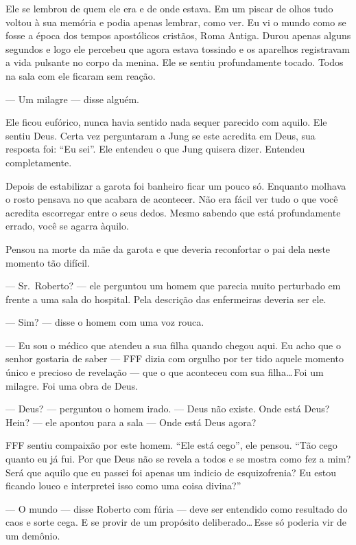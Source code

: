 Ele se lembrou de quem ele era e de onde estava. Em um piscar de olhos\mudanca{,} tudo voltou à sua memória e  podia apenas lembrar, como ver. Eu vi o mundo como se fosse a época dos tempos apostólicos cristãos, Roma Antiga. Durou apenas alguns segundos e logo ele percebeu que agora estava tossindo e os aparelhos registravam a vida pulsante no corpo da menina. Ele se sentiu profundamente tocado. Todos na sala com ele ficaram sem reação.

--- Um milagre --- disse alguém.

Ele ficou eufórico, nunca havia sentido nada sequer parecido com aquilo. Ele sentiu Deus. Certa vez perguntaram a Jung se este acredita em Deus, sua resposta foi: ``Eu sei''. Ele entendeu o que Jung quisera dizer. Entendeu completamente.

Depois de estabilizar a garota\mudanca{,} foi  banheiro ficar um pouco só. Enquanto molhava o rosto pensava no que acabara de acontecer. Não era fácil ver tudo o que você acredita escorregar entre o seus dedos. Mesmo sabendo que está profundamente errado, você se agarra àquilo.

Pensou na morte da mãe da garota e que deveria reconfortar o pai dela neste momento tão difícil.

--- Sr.~Roberto? --- ele perguntou  um homem que parecia muito perturbado em frente a uma sala do hospital. Pela descrição das enfermeiras deveria ser ele.

--- Sim? --- disse o homem com uma voz rouca.

--- Eu sou o médico que atendeu a sua filha quando chegou aqui. Eu acho que o senhor gostaria de saber --- FFF dizia com orgulho por ter tido aquele momento único e precioso de revelação --- que o que aconteceu com sua filha\ldots\,Foi um milagre. Foi uma obra de Deus.

--- Deus? --- perguntou o homem irado. --- Deus não existe. Onde está Deus? Hein? --- ele apontou para a sala --- Onde está Deus agora?

FFF sentiu compaixão por este homem. ``Ele está cego'', ele pensou. ``Tão cego quanto eu já fui. Por que Deus não se revela a todos e se mostra como fez a mim? Será que aquilo que eu passei foi apenas um indicio de esquizofrenia? Eu estou ficando louco e interpretei isso como uma coisa divina?''

--- O mundo --- disse Roberto com fúria --- deve ser entendido como resultado do caos e sorte cega. E se provir de um propósito deliberado\ldots\,Esse só poderia vir de um demônio.


